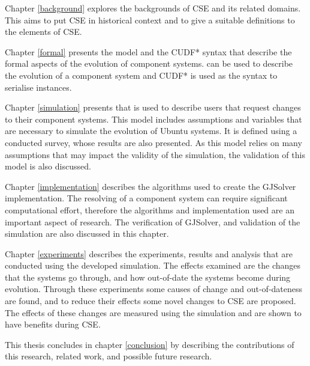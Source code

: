 Chapter \ref{background} explores the backgrounds of CSE and its related domains.
This aims to put CSE in historical context and to give a suitable definitions to the elements of CSE.

Chapter \ref{formal} presents the \modelname model and the CUDF* syntax that describe the formal aspects of the evolution of component systems.
\modelname can be used to describe the evolution of a component system and CUDF* is used as the syntax to serialise \modelname instances.

Chapter \ref{simulation} presents \usermodel that is used to describe users that request changes to their component systems.
This model includes assumptions and variables that are necessary to simulate the evolution of Ubuntu systems. 
It is defined using a conducted survey, whose results are also presented.
As this model relies on many assumptions that may impact the validity of the simulation, the validation of this model is also discussed. 

Chapter \ref{implementation} describes the algorithms used to create the GJSolver implementation.
The resolving of a component system can require significant computational effort,
therefore the algorithms and implementation used are an important aspect of research.
The verification of GJSolver, and validation of the simulation are also discussed in this chapter.

Chapter \ref{experiments} describes the experiments, results and analysis that are conducted using the developed simulation.
The effects examined are the changes that the systems go through, and how out-of-date the systems become during evolution.
Through these experiments some causes of change and out-of-dateness are found, and to reduce their effects some novel changes to CSE are proposed.
The effects of these changes are measured using the simulation and are shown to have benefits during CSE.

This thesis concludes in chapter \ref{conclusion} by describing the contributions of this research, related work, and possible future research.
